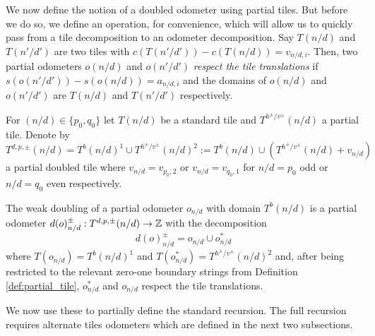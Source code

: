 \documentclass[12pt]{amsart}
\begin{document}
We now define the notion of a doubled odometer using partial tiles. But before we do so, we 
define an operation, for convenience, which will allow us to quickly pass from a tile decomposition 
to an odometer decomposition. Say $T(n/d)$ and $T(n'/d')$ are two tiles 
with  $c(T(n'/d')) - c(T(n/d)) = v_{n/d,i}$. Then, two partial odometers $o(n/d)$ and $o(n'/d')$ {\it respect the tile translations} if $s(o(n'/d')) - s(o(n/d)) = a_{n/d,i}$ and the domains of $o(n/d)$ and $o(n'/d')$ are $T(n/d)$ and $T(n'/d')$ respectively.

\begin{definition} \label{def:standard_odometer_doubling}
	For $(n/d) \in \{p_0,q_0\}$ let $T(n/d)$ be a standard tile and $T^{h^{\pm}/v^{\pm}}(n/d)$ a partial tile. Denote by
	 \begin{equation} \label{eq:doubled_tile_subset}
	 T^{d,p, \pm}(n/d) = T^b(n/d)^{1} \cup T^{h^{\pm}/v^{\pm}}(n/d)^2 :=  T^b(n/d) \cup (T^{h^{\pm}/v^{\pm}}(n/d) + v_{n/d})
	 \end{equation}
	 a partial doubled tile where $v_{n/d} = v_{p_0,2}$ or $v_{n/d} = v_{q_0,1}$ for $n/d = p_0$ odd or $n/d=q_0$ even respectively.
	 
	 The weak doubling of a partial odometer $o_{n/d}$ with domain $T^b(n/d)$  
	 is a partial odometer $d(o)^{\pm}_{n/d}:T^{d,p,\pm}(n/d) \to \mathbb{Z}$ with the decomposition
	 \begin{equation} \label{eq:doubled_odometer}
	 d(o)^{\pm}_{n/d} = o_{n/d} \cup o_{n/d}^*
	 \end{equation}
	 where $T(o_{n/d}) = T^b(n/d)^{1}$ and $T(o_{n/d}^*) = T^{h^{\pm}/v^{\pm}}(n/d)^2$
	 and, after being restricted to the relevant zero-one boundary strings from Definition \ref{def:partial_tile},
	 $o_{n/d}^*$ and $o_{n/d}$ respect the tile translations.  
\end{definition}



We now use these to partially define the standard recursion. The full recursion requires alternate tiles odometers
which are defined in the next two subsections. 
\end{document}
